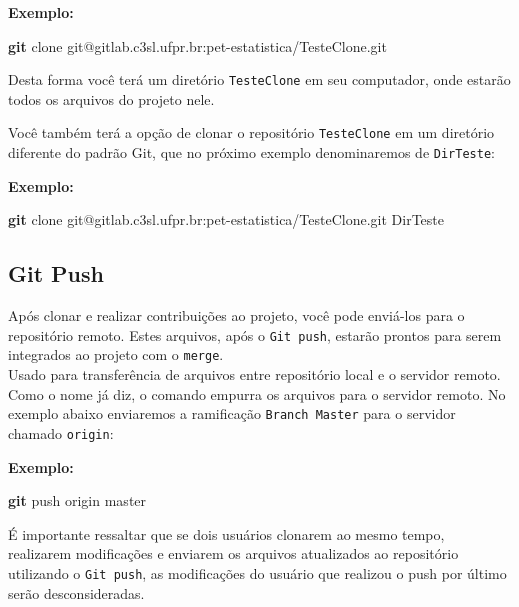 \documentclass[
  a5paper,
  pagesize,
  9pt,
  pointlessnumbers,
  normalheadings,
  twoside=false
]{book}
\newenvironment{Shaded}{\begin{snugshade}}{\end{snugshade}}
\newcommand{\KeywordTok}[1]{\textcolor[rgb]{0.13,0.29,0.53}{\textbf{{#1}}}}
\newcommand{\NormalTok}[1]{{#1}}
\begin{document}
\textbf{Exemplo:}

\begin{Shaded}
\begin{Highlighting}[]
\KeywordTok{git} \NormalTok{clone git@gitlab.c3sl.ufpr.br:pet-estatistica/TesteClone.git}
\end{Highlighting}
\end{Shaded}

Desta forma você terá um diretório \texttt{TesteClone} em seu
computador, onde estarão todos os arquivos do projeto nele.

Você também terá a opção de clonar o repositório \texttt{TesteClone} em
um diretório diferente do padrão Git, que no próximo exemplo
denominaremos de \texttt{DirTeste}:

\textbf{Exemplo:}

\begin{Shaded}
\begin{Highlighting}[]
\KeywordTok{git} \NormalTok{clone git@gitlab.c3sl.ufpr.br:pet-estatistica/TesteClone.git DirTeste}
\end{Highlighting}
\end{Shaded}

\subsection{Git Push}\label{git-push}

Após clonar e realizar contribuições ao projeto, você pode enviá-los
para o repositório remoto. Estes arquivos, após o \texttt{Git push},
estarão prontos para serem integrados ao projeto com o
\texttt{merge}.\\Usado para transferência de arquivos entre repositório
local e o servidor remoto. Como o nome já diz, o comando empurra os
arquivos para o servidor remoto. No exemplo abaixo enviaremos a
ramificação \texttt{Branch Master} para o servidor chamado
\texttt{origin}:

\textbf{Exemplo:}

\begin{Shaded}
\begin{Highlighting}[]
\KeywordTok{git} \NormalTok{push origin master}
\end{Highlighting}
\end{Shaded}

É importante ressaltar que se dois usuários clonarem ao mesmo tempo,
realizarem modificações e enviarem os arquivos atualizados ao
repositório utilizando o \texttt{Git push}, as modificações do usuário
que realizou o push por último serão desconsideradas.
\end{document}
